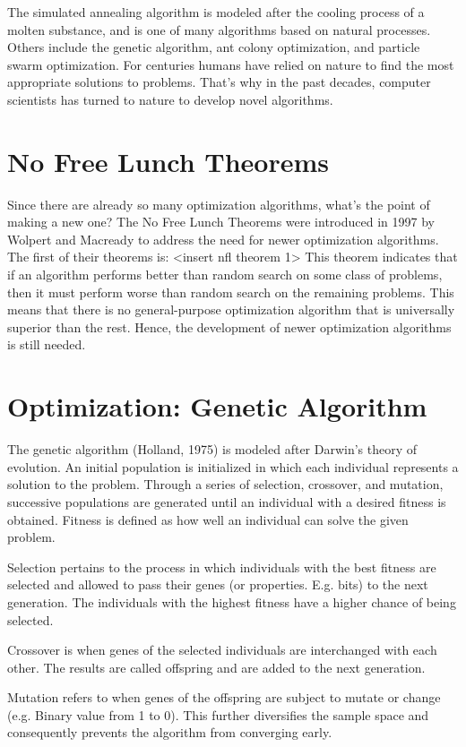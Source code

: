 The simulated annealing algorithm is modeled after the cooling process of a molten substance, and is one of many algorithms based on natural processes. Others include the genetic algorithm, ant colony optimization, and particle swarm optimization. For centuries humans have relied on nature to find the most appropriate solutions to problems. That's why in the past decades, computer scientists has turned to nature to develop novel algorithms.

\section{No Free Lunch Theorems}
Since there are already so many optimization algorithms, what's the point of making a new one? The No Free Lunch Theorems were introduced in 1997 by Wolpert and Macready to address the need for newer optimization algorithms. The first of their theorems is:
<insert nfl theorem 1>
This theorem indicates that if an algorithm performs better than random search on some class of problems, then it must perform worse than random search on the remaining problems. This means that there is no general-purpose optimization algorithm that is universally superior than the rest. Hence, the development of newer optimization algorithms is still needed.

\section{Optimization: Genetic Algorithm}
The genetic algorithm (Holland, 1975) is modeled after Darwin’s theory of evolution. An initial population is initialized in which each individual represents a solution to the problem. Through a series of selection, crossover, and mutation, successive populations are generated until an individual with a desired fitness is obtained. Fitness is defined as how well an individual can solve the given problem.

Selection pertains to the process in which individuals with the best fitness are selected and allowed to pass their genes (or properties. E.g. bits) to the next generation. The individuals with the highest fitness have a higher chance of being selected.

Crossover is when genes of the selected individuals are interchanged with each other. The results are called offspring and are added to the next generation.

Mutation refers to when genes of the offspring are subject to mutate or change (e.g. Binary value from 1 to 0). This further diversifies the sample space and consequently prevents the algorithm from converging early.

